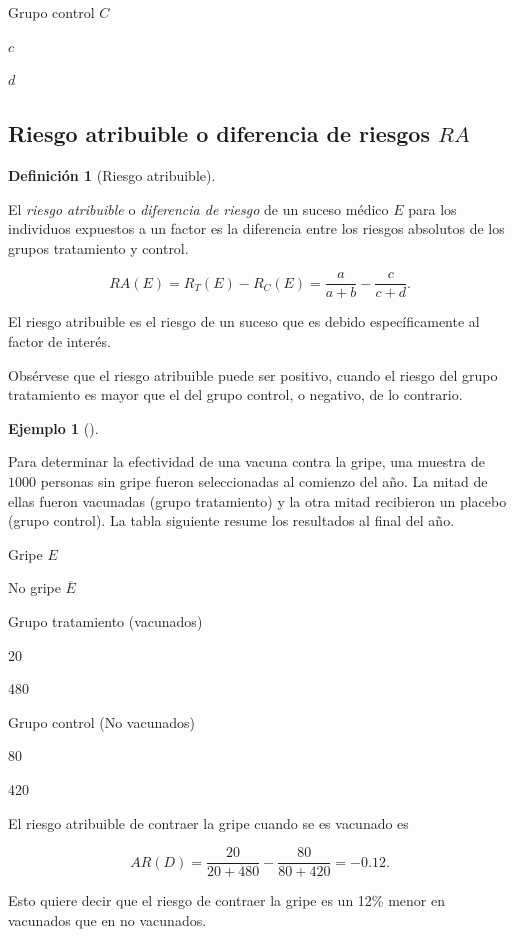 \documentclass[
  a4paper,
]{scrreport}
\theoremstyle{plain}
\theoremstyle{definition}
\newtheorem{definition}{Definición}[chapter]
\theoremstyle{definition}
\newtheorem{example}{Ejemplo}[chapter]
\theoremstyle{remark}
\begin{document}
Grupo control \(C\)

\(c\)

\(d\)

\subsection{\texorpdfstring{Riesgo atribuible o diferencia de riesgos
\(RA\)}{Riesgo atribuible o diferencia de riesgos RA}}\label{riesgo-atribuible-o-diferencia-de-riesgos-ra}

\begin{definition}[Riesgo
atribuible]\protect\hypertarget{def-riesgo-atribuible}{}\label{def-riesgo-atribuible}

El \emph{riesgo atribuible} o \emph{diferencia de riesgo} de un suceso
médico \(E\) para los individuos expuestos a un factor es la diferencia
entre los riesgos absolutos de los grupos tratamiento y control.

\[RA(E)=R_T(E)-R_C(E)=\frac{a}{a+b}-\frac{c}{c+d}.\]

\end{definition}

El riesgo atribuible es el riesgo de un suceso que es debido
específicamente al factor de interés.

Obsérvese que el riesgo atribuible puede ser positivo, cuando el riesgo
del grupo tratamiento es mayor que el del grupo control, o negativo, de
lo contrario.

\begin{example}[]\protect\hypertarget{exm-riesgo-atribuible}{}\label{exm-riesgo-atribuible}

Para determinar la efectividad de una vacuna contra la gripe, una
muestra de \(1000\) personas sin gripe fueron seleccionadas al comienzo
del año. La mitad de ellas fueron vacunadas (grupo tratamiento) y la
otra mitad recibieron un placebo (grupo control). La tabla siguiente
resume los resultados al final del año.

Gripe \(E\)

No gripe \(\overline E\)

Grupo tratamiento (vacunados)

20

480

Grupo control (No vacunados)

80

420

El riesgo atribuible de contraer la gripe cuando se es vacunado es

\[AR(D) = \frac{20}{20+480}-\frac{80}{80+420} = -0.12.\]

Esto quiere decir que el riesgo de contraer la gripe es un 12\% menor en
vacunados que en no vacunados.

\end{example}
\end{document}
